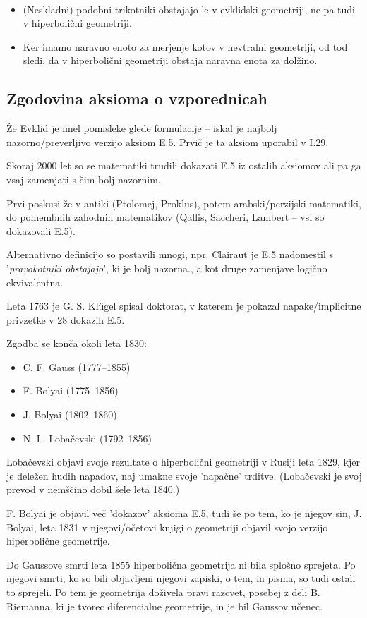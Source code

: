     \begin{opomba}
        ~
        \begin{itemize}
            \item (Neskladni) podobni trikotniki obstajajo le v evklidski geometriji, ne pa tudi v hiperbolični geometriji.
            \item Ker imamo naravno enoto za merjenje kotov v nevtralni geometriji, od tod sledi, da v hiperbolični geometriji obstaja naravna enota za dolžino.
        \end{itemize}
    \end{opomba}

    \subsection{Zgodovina aksioma o vzporednicah}

        Že Evklid je imel pomisleke glede formulacije -- iskal je najbolj nazorno/preverljivo verzijo aksiom E.5. Prvič je ta aksiom uporabil v  I.29.

        Skoraj 2000 let so se matematiki trudili dokazati E.5 iz ostalih aksiomov  ali pa ga vsaj zamenjati s čim bolj nazornim.

        Prvi poskusi že v antiki (Ptolomej, Proklus), potem arabski/perzijski matematiki, do pomembnih zahodnih matematikov (Qallis, Saccheri, Lambert -- vsi so dokazovali E.5).

        Alternativno definicijo so postavili mnogi, npr. Clairaut je E.5 nadomestil s '\textit{pravokotniki obstajajo}', ki je bolj nazorna., a kot druge zamenjave logično ekvivalentna.

        Leta 1763 je G. S. Klügel spisal doktorat, v katerem je pokazal napake/implicitne privzetke v 28 dokazih E.5.

        Zgodba se konča okoli leta 1830:
        \begin{itemize}
            \item C. F. Gauss (1777--1855)
            \item F. Bolyai (1775--1856)
            \item J. Bolyai (1802--1860)
            \item N. L. Lobačevski (1792--1856)
        \end{itemize}

        Lobačevski objavi svoje rezultate o hiperbolični geometriji v Rusiji leta 1829, kjer je deležen hudih napadov, naj umakne svoje 'napačne' trditve. (Lobačevski je svoj prevod v nemščino dobil šele leta 1840.)

        F. Bolyai je objavil več 'dokazov' aksioma E.5, tudi še po tem, ko je njegov sin, J. Bolyai, leta 1831 v njegovi/očetovi knjigi o geometriji objavil svojo verzijo hiperbolične geometrije.

        Do Gaussove smrti leta 1855 hiperbolična geometrija ni bila splošno sprejeta. Po njegovi smrti, ko so bili objavljeni njegovi zapiski, o tem, in pisma, so tudi ostali to sprejeli.
        Po tem je geometrija doživela pravi razcvet, posebej z deli B.  Riemanna, ki je tvorec diferencialne geometrije, in je bil Gaussov učenec.
